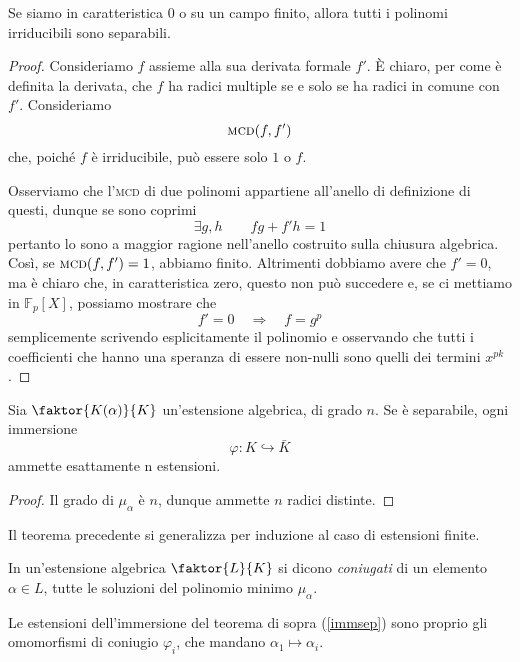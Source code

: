\begin{multicols}{2}
\begin{theorem}
	Se siamo in caratteristica $ 0 $ o su un campo finito, allora tutti i polinomi irriducibili sono separabili.
\end{theorem}
\begin{proof}
	Consideriamo $ f $ assieme alla sua derivata formale $ f' $. \`{E} chiaro, per come è definita la derivata, che $ f $ ha radici multiple se e solo se ha radici in comune con $ f' $. Consideriamo
	$$  \textsc{mcd}(f, f')  $$
	che, poiché $ f $ è irriducibile, può essere solo $ 1 $ o $ f $.
	
	Osserviamo che l'\textsc{mcd} di due polinomi appartiene all'anello di definizione di questi, dunque se sono coprimi
	\[ \exists g, h  \qquad fg +f'h = 1 \]
	pertanto lo sono a maggior ragione nell'anello costruito sulla chiusura algebrica. Così, se $  \textsc{mcd}(f, f') = 1  $, abbiamo finito. Altrimenti dobbiamo avere che $ f'=0 $, ma è chiaro che, in caratteristica zero, questo non può succedere e, se ci mettiamo in $ \mathbb{F}_p[X] $, possiamo mostrare che
	\[ f' = 0 \quad\Rightarrow\quad f = g^p \]
	semplicemente scrivendo esplicitamente il polinomio e osservando che tutti i coefficienti che hanno una speranza di essere non-nulli sono quelli dei termini $ x^{pk} $.
\end{proof}

\begin{theorem}\label{immsep}
	Sia $ \faktor{K(\alpha)}{K} $ un'estensione algebrica, di grado $ n $. Se è separabile, ogni immersione
	\[ \varphi: K \hookrightarrow \bar{K} \]
	ammette esattamente n estensioni.
\end{theorem}
\begin{proof}
	Il grado di $ \mu_\alpha $ è $ n $, dunque ammette $ n $ radici distinte.
\end{proof}
\begin{remark}
	Il teorema precedente si generalizza per induzione al caso di estensioni finite.
\end{remark}

\begin{definition}
	In un'estensione algebrica $ \faktor{L}{K} $ si dicono \emph{coniugati} di un elemento $ \alpha \in L $, tutte le soluzioni del polinomio minimo $ \mu_\alpha $.
\end{definition}

\begin{remark}
	Le estensioni dell'immersione del teorema di sopra (\ref{immsep}) sono proprio gli omomorfismi di coniugio $ \varphi_i $, che mandano $ \alpha_1 \mapsto \alpha_i $.
\end{remark}


\end{multicols}
